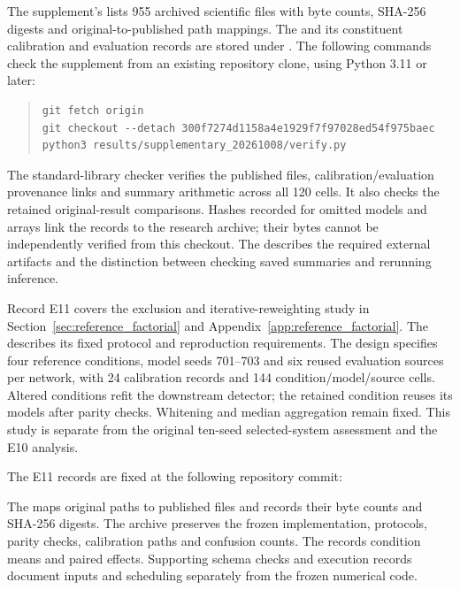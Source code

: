 The supplement's  lists 955 archived scientific files with byte counts, SHA-256 digests and original-to-published path mappings. The  and its constituent calibration and evaluation records are stored under . The following commands check the supplement from an existing repository clone, using Python 3.11 or later:
\begin{quote}\small
\begin{verbatim}
git fetch origin
git checkout --detach 300f7274d1158a4e1929f7f97028ed54f975baec
python3 results/supplementary_20261008/verify.py
\end{verbatim}
\end{quote}
The standard-library checker verifies the published files, calibration/evaluation provenance links and summary arithmetic across all 120 cells. It also checks the retained original-result comparisons. Hashes recorded for omitted models and arrays link the records to the research archive; their bytes cannot be independently verified from this checkout. The  describes the required external artifacts and the distinction between checking saved summaries and rerunning inference.

\label{ev:E11}
Record E11 covers the exclusion and iterative-reweighting study in Section~\ref{sec:reference_factorial} and Appendix~\ref{app:reference_factorial}. The  describes its fixed protocol and reproduction requirements. The design specifies four reference conditions, model seeds 701--703 and six reused evaluation sources per network, with 24 calibration records and 144 condition/model/source cells. Altered conditions refit the downstream detector; the retained condition reuses its models after parity checks. Whitening and median aggregation remain fixed. This study is separate from the original ten-seed selected-system assessment and the E10 analysis.

The E11 records are fixed at the following repository commit:
\begin{center}\small\texttt{\factorcommit}\end{center}

The  maps original paths to published files and records their byte counts and SHA-256 digests. The archive preserves the frozen implementation, protocols, parity checks, calibration paths and confusion counts. The  records condition means and paired effects. Supporting schema checks and execution records document inputs and scheduling separately from the frozen numerical code.

